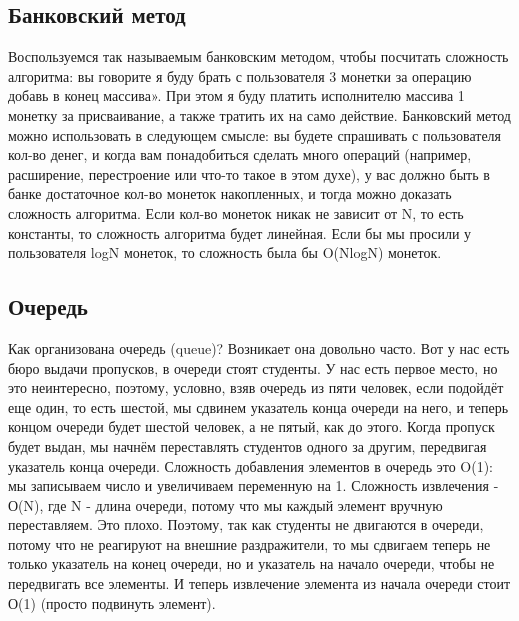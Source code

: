 \documentclass[12pt]{article}
\begin{document}
\subsection*{Банковский метод}
Воспользуемся так называемым банковским методом, чтобы посчитать сложность алгоритма: вы говорите я буду брать с пользователя 3 монетки за операцию добавь в конец массива». При этом я буду платить исполнителю массива 1 монетку за присваивание, а также тратить их на само действие. Банковский метод можно использовать в следующем смысле: вы будете спрашивать с пользователя кол-во денег, и когда вам понадобиться сделать много операций (например, расширение, перестроение или что-то такое в этом духе), у вас должно быть в банке достаточное кол-во монеток накопленных, и тогда можно доказать сложность алгоритма. Если кол-во монеток никак не зависит от N, то есть константы, то сложность алгоритма будет линейная. Если бы мы просили у пользователя logN монеток, то сложность была бы O(NlogN) монеток.

\subsection*{Очередь}
Как организована очередь (queue)? Возникает она довольно часто. Вот у нас есть бюро выдачи пропусков, в очереди стоят студенты. У нас есть первое место, но это неинтересно, поэтому, условно, взяв очередь из пяти человек, если подойдёт еще один, то есть шестой, мы сдвинем указатель конца очереди на него, и теперь концом очереди будет шестой человек, а не пятый, как до этого. Когда пропуск будет выдан, мы начнём переставлять студентов одного за другим, передвигая указатель конца очереди. Сложность добавления элементов в очередь это O(1): мы записываем число и увеличиваем переменную на 1. Сложность извлечения - О(N), где N - длина очереди, потому что мы каждый элемент вручную переставляем. Это плохо. Поэтому, так как студенты не двигаются в очереди, потому что не реагируют на внешние раздражители, то мы сдвигаем теперь не только указатель на конец очереди, но и указатель на начало очереди, чтобы не передвигать все элементы. И теперь извлечение элемента из начала очереди стоит О(1) (просто подвинуть элемент). 
\end{document}
